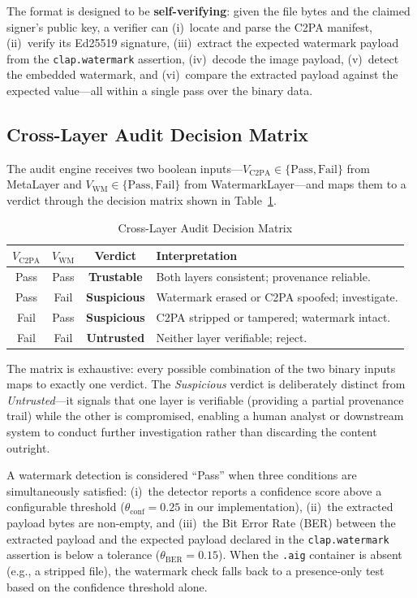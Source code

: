 \documentclass[conference]{IEEEtran}
\begin{document}
The format is designed to be \textbf{self-verifying}: given the file bytes
and the claimed signer's public key, a verifier can (i)~locate and parse the
C2PA manifest, (ii)~verify its Ed25519 signature, (iii)~extract the
expected watermark payload from the \texttt{clap.watermark} assertion,
(iv)~decode the image payload, (v)~detect the embedded watermark, and
(vi)~compare the extracted payload against the expected value—all within a
single pass over the binary data.

\subsection{Cross-Layer Audit Decision Matrix}

The audit engine receives two boolean inputs—$V_{\text{C2PA}} \in
\{\text{Pass}, \text{Fail}\}$ from MetaLayer and $V_{\text{WM}} \in
\{\text{Pass}, \text{Fail}\}$ from WatermarkLayer—and maps them to a
verdict through the decision matrix shown in Table~\ref{tab:decision}.

\begin{table}[ht]
\centering
\caption{Cross-Layer Audit Decision Matrix}
\label{tab:decision}
\begin{tabular}{|c|c|c|p{4cm}|}
\hline
\textbf{$V_{\text{C2PA}}$} & \textbf{$V_{\text{WM}}$} &
\textbf{Verdict} & \textbf{Interpretation} \\
\hline
Pass & Pass & \textbf{Trustable} &
Both layers consistent; provenance reliable. \\
\hline
Pass & Fail & \textbf{Suspicious} &
Watermark erased or C2PA spoofed; investigate. \\
\hline
Fail & Pass & \textbf{Suspicious} &
C2PA stripped or tampered; watermark intact. \\
\hline
Fail & Fail & \textbf{Untrusted} &
Neither layer verifiable; reject. \\
\hline
\end{tabular}
\end{table}

The matrix is exhaustive: every possible combination of the two binary
inputs maps to exactly one verdict.
The \textit{Suspicious} verdict is deliberately distinct from
\textit{Untrusted}—it signals that one layer is verifiable (providing a
partial provenance trail) while the other is compromised, enabling a
human analyst or downstream system to conduct further investigation
rather than discarding the content outright.

A watermark detection is considered ``Pass'' when three conditions are
simultaneously satisfied: (i)~the detector reports a confidence score
above a configurable threshold ($\theta_{\text{conf}} = 0.25$ in our
implementation), (ii)~the extracted payload bytes are non-empty, and
(iii)~the Bit Error Rate (BER) between the extracted payload and the
expected payload declared in the \texttt{clap.watermark} assertion is
below a tolerance ($\theta_{\text{BER}} = 0.15$).
When the \texttt{.aig} container is absent (e.g., a stripped file), the
watermark check falls back to a presence-only test based on the
confidence threshold alone.
\end{document}
